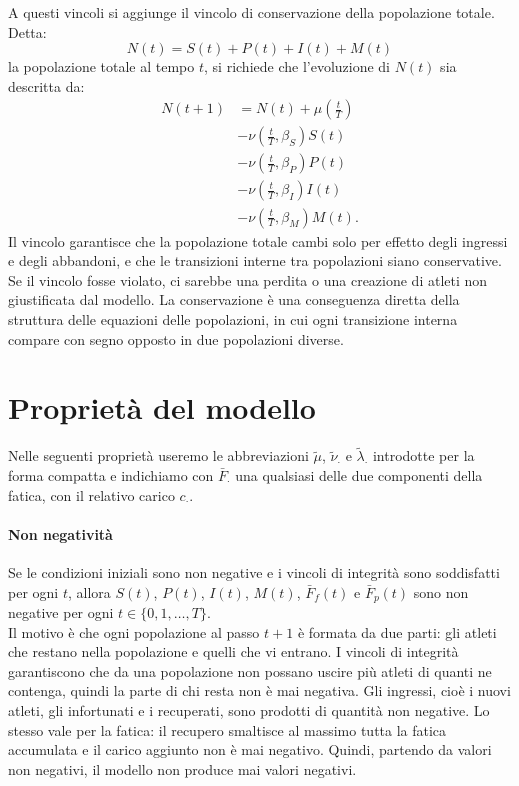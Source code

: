 A questi vincoli si aggiunge il vincolo di conservazione della popolazione totale. Detta:
\[
    N(t) = S(t) + P(t) + I(t) + M(t)
\]
la popolazione totale al tempo $t$, si richiede che l'evoluzione di $N(t)$ sia descritta da:
\begin{align*}
    N(t+1) &= N(t) + \mu\left(\frac{t}{T}\right) \\
        &- \nu\left(\frac{t}{T}, \beta_S\right) S(t) \\
        &- \nu\left(\frac{t}{T}, \beta_P\right) P(t) \\
        &- \nu\left(\frac{t}{T}, \beta_I\right) I(t) \\
        &- \nu\left(\frac{t}{T}, \beta_M\right) M(t).
\end{align*}
Il vincolo garantisce che la popolazione totale cambi solo per effetto degli ingressi e degli abbandoni, e che le transizioni interne tra popolazioni siano conservative. Se il vincolo fosse violato, ci sarebbe una perdita o una creazione di atleti non giustificata dal modello. La conservazione è una conseguenza diretta della struttura delle equazioni delle popolazioni, in cui ogni transizione interna compare con segno opposto in due popolazioni diverse.

\section{Proprietà del modello}

Nelle seguenti proprietà useremo le abbreviazioni $\tilde\mu$, $\tilde\nu_\cdot$ e $\tilde\lambda_\cdot$ introdotte per la forma compatta e indichiamo con $\bar{F}_\cdot$ una qualsiasi delle due componenti della fatica, con il relativo carico $c_\cdot$.

\paragraph{Non negatività}
Se le condizioni iniziali sono non negative e i vincoli di integrità sono soddisfatti per ogni $t$, allora $S(t)$, $P(t)$, $I(t)$, $M(t)$, $\bar{F}_f(t)$ e $\bar{F}_p(t)$ sono non negative per ogni $t \in \{0, 1, \dots, T\}$. \\
Il motivo è che ogni popolazione al passo $t+1$ è formata da due parti: gli atleti che restano nella popolazione e quelli che vi entrano. I vincoli di integrità garantiscono che da una popolazione non possano uscire più atleti di quanti ne contenga, quindi la parte di chi resta non è mai negativa. Gli ingressi, cioè i nuovi atleti, gli infortunati e i recuperati, sono prodotti di quantità non negative. Lo stesso vale per la fatica: il recupero smaltisce al massimo tutta la fatica accumulata e il carico aggiunto non è mai negativo. Quindi, partendo da valori non negativi, il modello non produce mai valori negativi.

